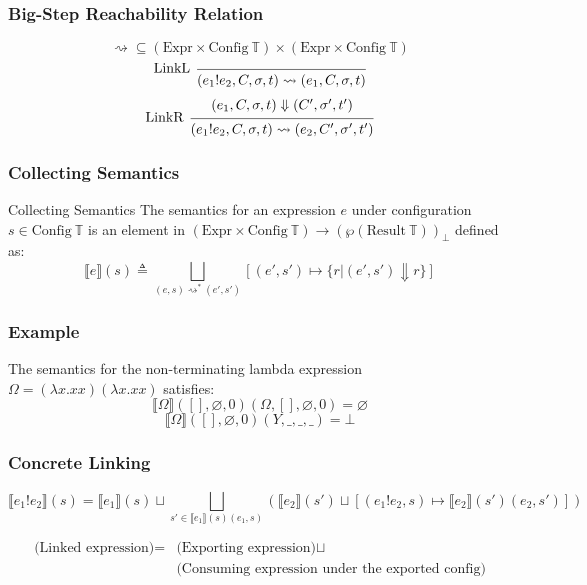 \documentclass{beamer}
\newcommand*{\Expr}{\text{Expr}}
\newcommand*{\Time}{\mathbb{T}}
\newcommand*{\Config}[1]{\text{Config}\:{#1}}
\newcommand*{\Result}[1]{\text{Result}\:{#1}}
\newcommand*{\link}[2]{{#1}\mathtt{!}{#2}}
\newcommand*{\sembracket}[1]{\lBrack{#1}\rBrack}
\begin{document}
\begin{frame}[c]
  \frametitle{Big-Step Reachability Relation}
  \[\rightsquigarrow\subseteq(\Expr\times\Config{\Time})\times(\Expr\times\Config{\Time})\]
  \pause
  \[
    \begin{prooftree}
      \infer[left label=LinkL]0{
      (\link{e_{1}}{e_{2}}, C, \sigma, t)
      \rightsquigarrow
      (e_{1}, C, \sigma, t)
      }
    \end{prooftree}
  \]
  \pause
  \[
    \begin{prooftree}
      \hypo{
        \begin{matrix}
          (e_{1}, C, \sigma, t)
          \Downarrow
          (C', \sigma', t')
        \end{matrix}
      }
      \infer[left label=LinkR]1{
      (\link{e_{1}}{e_{2}}, C, \sigma, t)
      \rightsquigarrow
      (e_{2}, C', \sigma', t')
      }
    \end{prooftree}
  \]
\end{frame}
\begin{frame}[c]
  \frametitle{Collecting Semantics}
  \begin{block}{Collecting Semantics}
    The semantics for an expression $e$ under configuration $s\in\Config{\Time}$ is an element in $(\Expr\times\Config{\Time})\rightarrow(\wp(\Result{\Time}))_{\bot}$ defined as:
    \[
      \sembracket{e}(s)\triangleq\bigsqcup_{(e,s)\rightsquigarrow^{*}(e',s')}[(e',s')\mapsto\{r|(e',s')\Downarrow r\}]
    \]
  \end{block}
\end{frame}
\begin{frame}[c]
  \frametitle{Example}
  The semantics for the non-terminating lambda expression $\Omega=(\lambda x.xx)(\lambda x.xx)$ satisfies:
  \[
    \sembracket{\Omega}([],\varnothing,0)(\Omega,[],\varnothing,0)=\varnothing
  \]
  \pause
  \[
    \sembracket{\Omega}([],\varnothing,0)(Y,\_,\_,\_)=\bot
  \]
\end{frame}
\begin{frame}[c]
  \frametitle{Concrete Linking}
  \[
    \sembracket{\link{e_1}{e_2}}(s)=\sembracket{e_1}(s)\sqcup\bigsqcup_{s'\in\sembracket{e_1}(s)(e_1,s)}\left(\sembracket{e_2}(s')\sqcup[(\link{e_1}{e_2},s)\mapsto\sembracket{e_2}(s')(e_2,s')]\right)
  \]

  \begin{align*}
    \text{(Linked expression)} = & \text{(Exporting expression)} \sqcup                    \\
                                 & \text{(Consuming expression under the exported config)}
  \end{align*}
\end{frame}
\end{document}
